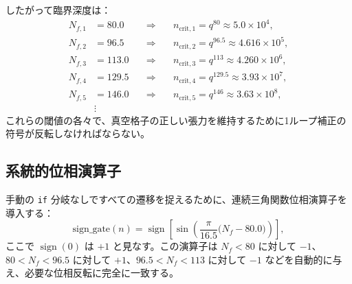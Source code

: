 \documentclass[11pt,a4paper]{article}
\begin{document}
	したがって臨界深度は：
	\begin{align}
		N_{f,1} &= 80.0 \quad &\Longrightarrow&\quad n_{\mathrm{crit},1} = q^{80} \approx 5.0\times10^4, \\
		N_{f,2} &= 96.5 \quad &\Longrightarrow&\quad n_{\mathrm{crit},2} = q^{96.5} \approx 4.616\times10^5, \\
		N_{f,3} &= 113.0 \quad &\Longrightarrow&\quad n_{\mathrm{crit},3} = q^{113} \approx 4.260\times10^6, \\
		N_{f,4} &= 129.5 \quad &\Longrightarrow&\quad n_{\mathrm{crit},4} = q^{129.5} \approx 3.93\times10^7, \\
		N_{f,5} &= 146.0 \quad &\Longrightarrow&\quad n_{\mathrm{crit},5} = q^{146} \approx 3.63\times10^8, \\
		&\vdots & &
	\end{align}
	これらの閾値の各々で、真空格子の正しい張力を維持するために1ループ補正の符号が反転しなければならない。
	
	\subsection{系統的位相演算子}
	手動の \texttt{if} 分岐なしですべての遷移を捉えるために、連続三角関数位相演算子を導入する：
	\begin{equation}
		\boxed{\mathrm{sign\_gate}(n) = \operatorname{sign}\!\left[\sin\!\left(\frac{\pi}{16.5}\bigl(N_f - 80.0\bigr)\right)\right]},
		\label{eq:phaseoperator}
	\end{equation}
	ここで \(\operatorname{sign}(0)\) は \( +1\) と見なす。この演算子は \(N_f<80\) に対して \(-1\)、\(80 < N_f < 96.5\) に対して \(+1\)、\(96.5 < N_f < 113\) に対して \(-1\) などを自動的に与え、必要な位相反転に完全に一致する。
	
\end{document}
